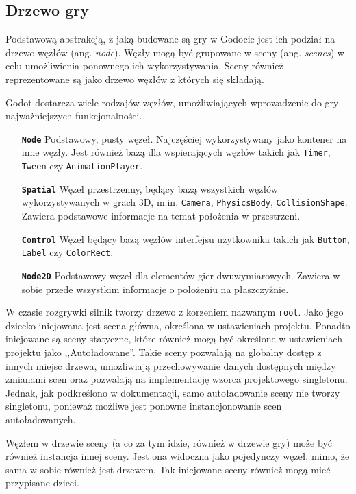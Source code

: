 \subsection{Drzewo gry}
Podstawową abstrakcją, z jaką budowane są gry w Godocie jest ich podział na drzewo węzłów (ang. \emph{node}). Węzły mogą być grupowane w sceny (ang. \emph{scenes}) w celu umożliwienia ponownego ich wykorzystywania. Sceny również reprezentowane są jako drzewo węzłów z których się składają. 

Godot dostarcza wiele rodzajów węzłów, umożliwiających wprowadzenie do gry najważniejszych funkcjonalności. 

\begin{itemize}
    \item[\textbf{\texttt{Node}}] Podstawowy, pusty węzeł. Najczęściej wykorzystywany jako kontener na inne węzły. Jest również bazą dla wspierających węzłów takich jak \texttt{Timer}, \texttt{Tween} czy \texttt{AnimationPlayer}.
    \item[\textbf{\texttt{Spatial}}] Węzeł przestrzenny, będący bazą wszystkich węzłów wykorzystywanych w grach 3D, m.in. \texttt{Camera}, \texttt{PhysicsBody}, \texttt{CollisionShape}. Zawiera podstawowe informacje na temat położenia w przestrzeni.
    \item[\textbf{\texttt{Control}}] Węzeł będący bazą węzłów interfejsu użytkownika takich jak \texttt{Button}, \texttt{Label} czy \texttt{ColorRect}.
    \item[\textbf{\texttt{Node2D}}] Podstawowy węzeł dla elementów gier dwuwymiarowych. Zawiera w sobie przede wszystkim informacje o położeniu na płaszczyźnie. 
\end{itemize}

W czasie rozgrywki silnik tworzy drzewo z korzeniem nazwanym \texttt{root}. Jako jego dziecko inicjowana jest scena główna, określona w ustawieniach projektu. Ponadto inicjowane są sceny statyczne, które również mogą być określone w ustawieniach projektu jako ,,Autoładowane''. Takie sceny pozwalają na globalny dostęp z innych miejsc drzewa, umożliwiają przechowywanie danych dostępnych między zmianami scen oraz pozwalają na implementację wzorca projektowego singletonu\cite{singleton_refactoring_guru}. Jednak, jak podkreślono w dokumentacji, samo autoładowanie sceny nie tworzy singletonu, ponieważ możliwe jest ponowne instancjonowanie scen autoładowanych. 

Węzłem w drzewie sceny (a co za tym idzie, również w drzewie gry) może być również instancja innej sceny. Jest ona widoczna jako pojedynczy węzeł, mimo, że sama w sobie również jest drzewem. Tak inicjowane sceny również mogą mieć przypisane dzieci.

